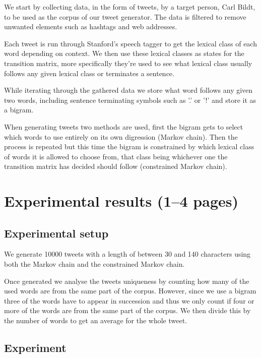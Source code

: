 \documentclass[a4paper,12pt]{article}
\begin{document}
We start by collecting data, in the form of tweets, by a target person, Carl Bildt, to be used as the corpus of our tweet generator. The data is filtered to remove unwanted elements such as hashtags and web addresses.

Each tweet is run through Stanford's speech tagger to get the lexical class of each word depending on context.
We then use these lexical classes as states for the transition matrix, more specifically they're used to see what lexical class usually follows any given lexical class or terminates a sentence.

While iterating through the gathered data we store what word follows any given two words, including sentence terminating symbols such as '.' or '!' and store it as a bigram.

When generating tweets two methods are used, first the bigram gets to select which words to use entirely on its own digression (Markov chain). Then the process is repeated but this time the bigram is constrained by which lexical class of words it is allowed to choose from, that class being whichever one the transition matrix has decided should follow (constrained Markov chain).

\section{Experimental results (1--4 pages)}
\label{sec:exps}

\subsection{Experimental setup}
We generate 10000 tweets with a length of between 30 and 140 characters using both the Markov chain and the constrained Markov chain.

Once generated we analyse the tweets uniqueness by counting how many of the used words are from the same part of the corpus. However, since we use a bigram three of the words have to appear in succession and thus we only count if four or more of the words are from the same part of the corpus. We then divide this by the number of words to get an average for the whole tweet.

\newpage
\subsection{Experiment}
\end{document}
